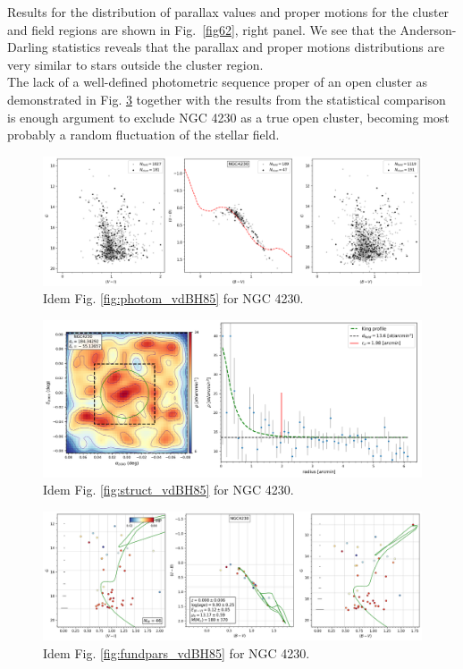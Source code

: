 \documentclass[referee]{aa}
\begin{document}
Results for the distribution of parallax values and proper motions for the
cluster and field regions are shown in Fig.~\ref{fig62}, right panel.
We see that the Anderson-Darling statistics reveals that the parallax and
proper motions distributions are very similar to stars outside the
cluster region.\\

The lack of a well-defined photometric sequence proper of an open cluster as
demonstrated in Fig. \ref{fig61} together with the results from
the statistical comparison is enough argument to exclude NGC 4230 as a true open
cluster, becoming most probably a random fluctuation of the stellar field.

\begin{figure}[ht]
    \centering
    \includegraphics[width=\hsize]{../figs/obs_NGC4230.png}
    \caption{Idem Fig. \ref{fig:photom_vdBH85} for NGC 4230.}
    \label{fig59}
\end{figure}
\begin{figure}[ht]
    \centering
    \includegraphics[width=\hsize]{../figs/dmap_ngc4230.png}
    \caption{Idem Fig. \ref{fig:struct_vdBH85} for NGC 4230.}
    \label{fig60}
\end{figure}
\begin{figure}[ht]
    \centering
    \includegraphics[width=\hsize]{../figs/cmds_ngc4230.png}
    \caption{Idem Fig. \ref{fig:fundpars_vdBH85} for NGC 4230.}
    \label{fig61}
\end{figure}
\end{document}
